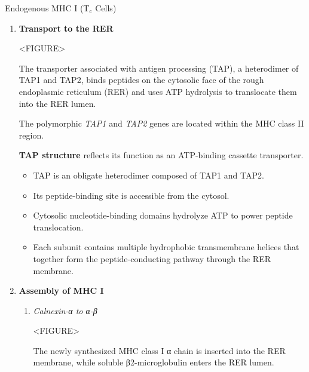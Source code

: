 \begin{core}[label=core:endogenous_mhci]{Endogenous MHC I (T$_{\text{c}}$ Cells)}
\begin{enumerate}[label=(\arabic*)]
        \item \textbf{Transport to the RER}

          <FIGURE>

          The transporter associated with antigen processing (TAP), a heterodimer of TAP1 and TAP2, binds peptides on the cytosolic face of the rough endoplasmic reticulum (RER) and uses ATP hydrolysis to translocate them into the RER lumen.

          The polymorphic \textit{TAP1} and \textit{TAP2} genes are located within the MHC class II region.

          \textbf{TAP structure} reflects its function as an ATP-binding cassette transporter.

          \begin{itemize}

            \item TAP is an obligate heterodimer composed of TAP1 and TAP2.

            \item Its peptide-binding site is accessible from the cytosol.

            \item Cytosolic nucleotide-binding domains hydrolyze ATP to power peptide translocation.

            \item Each subunit contains multiple hydrophobic transmembrane helices that together form the peptide-conducting pathway through the RER membrane.

          \end{itemize}

        \item \textbf{Assembly of MHC I}

          \begin{enumerate}

            \item \textit{Calnexin-α to α-β}

              <FIGURE>

              The newly synthesized MHC class I α chain is inserted into the RER membrane, while soluble β2-microglobulin enters the RER lumen.


\end{enumerate}
\end{enumerate}
\end{core}
